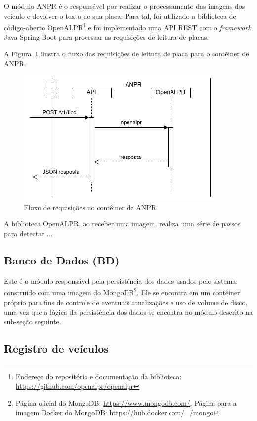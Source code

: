 \documentclass[12pt]{article}
\begin{document}
O módulo ANPR é o responsável por realizar o processamento das imagens dos veículo e devolver o texto de sua placa. Para tal, foi utilizado a biblioteca de código-aberto OpenALPR\footnote{Endereço do repositório e documentação da biblioteca: \url{https://github.com/openalpr/openalpr}} e foi implementado uma API REST com o \textit{framework} Java Spring-Boot para processar as requisições de leitura de placas.

A Figura~\ref{fig:anpr4j-data} ilustra o fluxo das requisições de leitura de placa para o contêiner de ANPR.

\begin{figure}[ht]
	\centering
	\includegraphics[width=.8\textwidth]{anpr4j-data.jpg}
	\caption{Fluxo de requisições no contêiner de ANPR}
	\label{fig:anpr4j-data}
\end{figure}

A biblioteca OpenALPR, ao receber uma imagem, realiza uma série de passos para detectar ...

\subsection{Banco de Dados (BD)}

Este é o módulo responsável pela persistência dos dados usados pelo sistema, construído com uma imagem do MongoDB\footnote{Página oficial do MongoDB: \url{https://www.mongodb.com/}. Página para a imagem Docker do MongoDB: \url{https://hub.docker.com/_/mongo}}. Ele se encontra em um contêiner próprio para fins de controle de eventuais atualizações e uso de volume de disco, uma vez que a lógica da persistência dos dados se encontra no módulo descrito na sub-seção seguinte.

\subsection{Registro de veículos}
\end{document}
